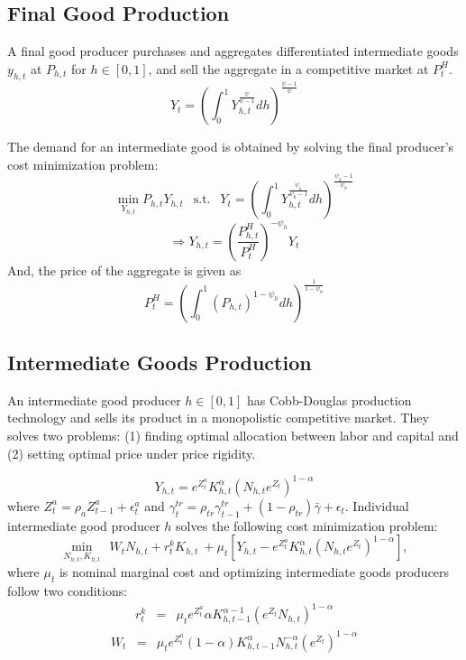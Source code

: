 \documentclass[11pt,titlepage]{article}
\begin{document}
\subsection{Final Good Production}

A final good producer purchases and aggregates differentiated intermediate goods $y_{h,t}$ at $P_{h,t}$ for $h\in [0,1]$, and sell the aggregate in a competitive market at $P_t^H$.
 \begin{displaymath}  Y_t = \left(\int_{0}^{1} Y_{h,t}^{\frac{\psi}{\psi-1}} dh\right)^{\frac{\psi-1}{\psi}} \end{displaymath}

 
 The demand for an intermediate good is obtained by solving the final producer's cost minimization problem: 
  \begin{displaymath}
  \min_{Y_{h,t}} P_{h,t} Y_{h,t} ~~\text{ s.t. }~~ Y_t = \left(\int_{0}^{1}Y_{h,t}^{\frac{\psi_h}{\psi_h-1}} dh\right)^{\frac{\psi_h-1}{\psi_h}}  \end{displaymath}
  \begin{displaymath}
\Rightarrow  Y_{h,t} = \left(\frac{P_{h,t}^H}{P_t^H}\right)^{-\psi_h} Y_t 
 \end{displaymath}
And, the price of the aggregate is given as
  \begin{displaymath}
  P_{t}^H =  \left(\int_0^1(P_{h,t})^{1-\psi_h} dh \right)^{\frac{1}{1-\psi_h}} 
 \end{displaymath}

 
 \subsection{Intermediate Goods Production}

An intermediate good producer $h \in [0,1]$ has Cobb-Douglas production technology and sells its product in a monopolistic competitive market. They solves two problems: (1) finding optimal allocation between labor and capital and (2) setting optimal price under price rigidity.

\begin{equation}
Y_{h,t} = e^{Z_t^a} K_{h,t}^\alpha \left(N_{h,t} e^{Z_t} \right)^{1-\alpha}
\end{equation}
where $Z_t^a = \rho_a Z_{t-1}^a + \epsilon_t^a$ and  $\gamma_t^{tr} = \rho_{tr} \gamma_{t-1}^{tr} + (1-\rho_{tr})\bar{\gamma} + \epsilon_t$. Individual intermediate good producer $h$ solves the following cost minimization problem: 
 \begin{displaymath}
\min_{N_{h,t}, K_{h,t}} ~~W_t N_{h,t} + r_t^k K_{h,t} ~+
 \mu_t\left[ Y_{h,t} - e^{Z_t^a} K_{h,t}^\alpha \left(N_{h,t} e^{Z_t} \right)^{1-\alpha} \right],
\end{displaymath}
where $\mu_t$ is nominal marginal cost and optimizing intermediate goods producers follow two conditions:
 \begin{eqnarray} r_t^k &=& \mu_t e^{Z_t^a} \alpha K_{h,t-1}^{\alpha-1} (e^{Z_{t}} N_{h,t})^{1-\alpha} 
\end{eqnarray}    
 \begin{eqnarray}
  W_t &=& \mu_t e^{Z_t^a} (1-\alpha) K_{h,t-1}^{\alpha}N_{h,t}^{-\alpha}(e^{Z_{t}})^{1-\alpha}
\end{eqnarray}    
 
\end{document}
